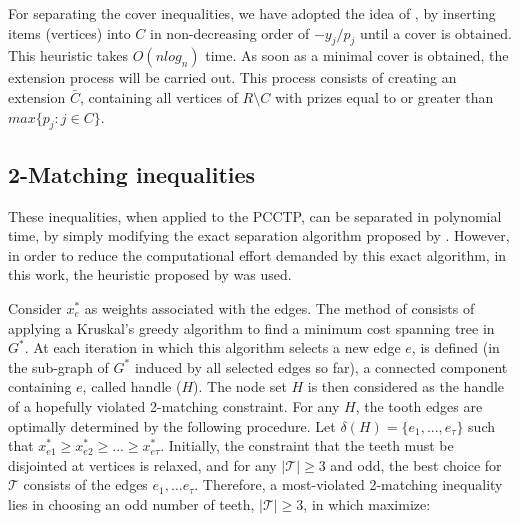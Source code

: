 \documentclass{singlecol-new}
\theoremstyle{TH}{
\newtheorem{lemma}{Lemma}
\newtheorem{theorem}[lemma]{Theorem}
\newtheorem{corrolary}[lemma]{Corrolary}
\newtheorem{conjecture}[lemma]{Conjecture}
\newtheorem{proposition}[lemma]{Proposition}
\newtheorem{claim}[lemma]{Claim}
\newtheorem{stheorem}[lemma]{Wrong Theorem}
}
\theoremstyle{THrm}{
\newtheorem{definition}{Definition}[section]
\newtheorem{question}{Question}[section]
\newtheorem{remark}{Remark}
\newtheorem{scheme}{Scheme}
}
\theoremstyle{THhit}{
\newtheorem{case}{Case}[section]
}
\begin{document}

For separating the cover inequalities, we have adopted the idea of \citet{crowder1983solving}, by inserting items (vertices) into $C$ in non-decreasing order of $-y_j/p_j$ until a cover is obtained. This heuristic takes $O(n log_n)$ time. As soon as a minimal cover is obtained, the extension process will be carried out. This process consists of creating an extension $\bar{C}$, containing all vertices of $R\setminus C$ with prizes equal to or greater than $max \{p_j: j \in C\}$.


\subsection{2-Matching inequalities}

These inequalities, when applied to the PCCTP, can be separated in polynomial time, by simply modifying the exact separation algorithm proposed by \citet{padberg1982odd}. However, in order to reduce the computational effort demanded by this exact algorithm, in this work, the heuristic proposed by \citet{fischetti1998solving} was used.

Consider $ x_e^*$ as weights associated with the edges. The method of \citet {fischetti1998solving} consists of applying a Kruskal's greedy algorithm \cite {gower1969minimum} to find a minimum cost spanning tree in $ G^*$. At each iteration in which this algorithm selects a new edge $e$, is defined (in the sub-graph of $G^*$ induced by all selected edges so far), a connected component containing $e$, called handle ($ H $). The node set $H$ is then considered as the handle of a hopefully violated 2-matching constraint. For any $ H $, the tooth edges are optimally determined by the following procedure. Let $\delta (H) = \{e_1, ..., e_ \tau \}$ such that $x_ {e1}^* \geq x_ {e2}^* \geq ... \geq x_ {e \tau}^*$. Initially, the constraint that the teeth must be disjointed at vertices is relaxed, and for any $ | \mathcal{T} | \geq 3$ and odd, the best choice for $ \mathcal{T} $ consists of the edges $ e_1, ... e_\tau$. Therefore, a most-violated 2-matching inequality lies in choosing an odd number of teeth, $ |\mathcal{T}| \geq 3 $, in which maximize:
\end{document}
